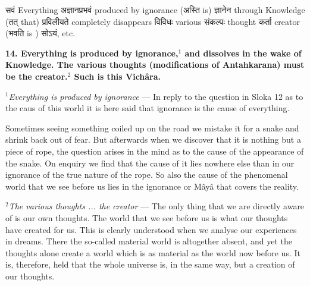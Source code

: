 \documentclass{article}
\begin{document}
\texthindi{सवं }
Everything
\texthindi{अज्ञानप्रभवं}
produced by ignorance
(\texthindi{अस्ति}
is)
\texthindi{ज्ञानेन}
through Knowledge
(\texthindi{तत् }
that)
\texthindi{ प्रविलीयते }
completely disappears
\texthindi{विविधः }
various 
\texthindi{ संकल्पः}
thought
\texthindi{ कर्ता}
creator
(\texthindi{भवति }
is )
\texthindi{सोऽयं, }
etc.

\bigskip

\textbf{14. Everything is produced by ignorance,$^1$ and dissolves in the wake
of Knowledge. The various thoughts (modifications of Antahkarana) must be the
creator.$^2$ Such is this Vichâra.
}


{\small
\textit{$^1$Everything is produced by ignorance} --- In reply to the
question in Sloka 12 as to the caus of this world it is here said that
ignorance is the cause of everything.

Sometimes seeing something coiled up on the road we mistake it for a snake and
shrink back out of fear. But afterwards when we discover that it is nothing but
a piece of rope, the question arises in the mind as to the cause of the
appearance of the snake. On enquiry we find that the cause of it lies nowhere
else than in our ignorance of the true nature of the rope. So also the cause of
the phenomenal world that we see before us lies in the ignorance or Mâyâ that
covers the reality.

\textit{$^2$The various thoughts ... the creator} --- The only thing that we
are directly aware of is our own thoughts. The world that we see before us is
what our thoughts have created for us. This is clearly understood when we
analyse our experiences in dreams. There the so-called material world is
altogether absent, and yet the thoughts alone create a world which is as
material as the world now before us. It is, therefore, held that the whole
universe is, in the same way, but a creation of our thoughts.
}
\end{document}
